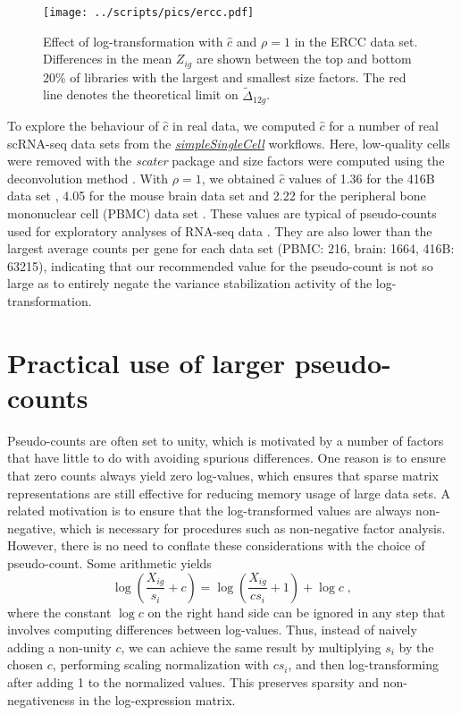 \documentclass[10pt,letterpaper]{article}
\begin{document}
\begin{figure}
\begin{center}
    \texttt{[image: ../scripts/pics/ercc.pdf]}
\end{center}
\caption{Effect of log-transformation with $\hat c$ and $\rho =1$ in the ERCC data set.
Differences in the mean $Z_{ig}$ are shown between the top and bottom 20\% of libraries with the largest and smallest size factors.
The red line denotes the theoretical limit on $\tilde \Delta_{12g}$.}
\label{fig:bigreal}
\end{figure}

To explore the behaviour of $\hat c$ in real data, we computed $\hat c$ for a number of real scRNA-seq data sets from the \href{http://bioconductor.org/packages/devel/workflows/html/simpleSingleCell.html}{\emph{simpleSingleCell}} workflows.
Here, low-quality cells were removed with the \emph{scater} package \cite{mccarthy2017scater} and size factors were computed using the deconvolution method \cite{lun2016pooling}.
With $\rho=1$, we obtained $\hat c$ values of 1.36 for the 416B data set \cite{lun2017assessing}, 4.05 for the mouse brain data set \cite{zeisel2015brain} and 2.22 for the peripheral bone mononuclear cell (PBMC) data set \cite{zheng2017massively}.
These values are typical of pseudo-counts used for exploratory analyses of RNA-seq data \cite{chen2016reads}.
They are also lower than the largest average counts per gene for each data set (PBMC: 216, brain: 1664, 416B: 63215),
indicating that our recommended value for the pseudo-count is not so large as to entirely negate the variance stabilization activity of the log-transformation.     

\section{Practical use of larger pseudo-counts}
Pseudo-counts are often set to unity, which is motivated by a number of factors that have little to do with avoiding spurious differences.
One reason is to ensure that zero counts always yield zero log-values, which ensures that sparse matrix representations are still effective for reducing memory usage of large data sets.
A related motivation is to ensure that the log-transformed values are always non-negative, which is necessary for procedures such as non-negative factor analysis.
However, there is no need to conflate these considerations with the choice of pseudo-count.
Some arithmetic yields 
\[
 \log\left(\frac{X_{ig}}{s_i}+ c\right) = \log\left(\frac{X_{ig}}{cs_i}+ 1\right) + \log c \;,
\]
where the constant $\log c$ on the right hand side can be ignored in any step that involves computing differences between log-values.
Thus, instead of naively adding a non-unity $c$, we can achieve the same result by multiplying $s_i$ by the chosen $c$, performing scaling normalization with $cs_i$, and then log-transforming after adding 1 to the normalized values.
This preserves sparsity and non-negativeness in the log-expression matrix.
\end{document}
